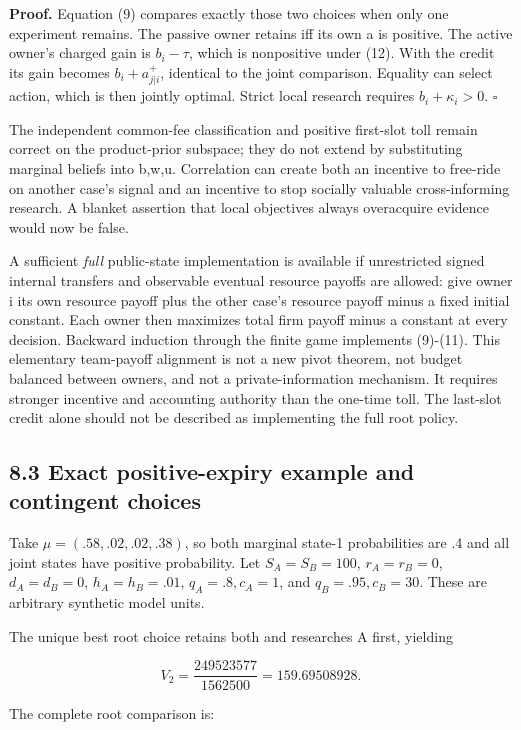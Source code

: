 \documentclass[
  11pt,
]{article}
\begin{document}
\textbf{Proof.} Equation (9) compares exactly those two choices when
only one experiment remains. The passive owner retains iff its own a is
positive. The active owner's charged gain is \(b_i-\tau\), which is
nonpositive under (12). With the credit its gain becomes
\(b_i+a_{j|i}^+\), identical to the joint comparison. Equality can
select action, which is then jointly optimal. Strict local research
requires \(b_i+\kappa_i>0\). \(\square\)

The independent common-fee classification and positive first-slot toll
remain correct on the product-prior subspace; they do not extend by
substituting marginal beliefs into b,w,u. Correlation can create both an
incentive to free-ride on another case's signal and an incentive to stop
socially valuable cross-informing research. A blanket assertion that
local objectives always overacquire evidence would now be false.

A sufficient \emph{full} public-state implementation is available if
unrestricted signed internal transfers and observable eventual resource
payoffs are allowed: give owner i its own resource payoff plus the other
case's resource payoff minus a fixed initial constant. Each owner then
maximizes total firm payoff minus a constant at every decision. Backward
induction through the finite game implements (9)-(11). This elementary
team-payoff alignment is not a new pivot theorem, not budget balanced
between owners, and not a private-information mechanism. It requires
stronger incentive and accounting authority than the one-time toll. The
last-slot credit alone should not be described as implementing the full
root policy.

\subsection{8.3 Exact positive-expiry example and contingent
choices}\label{exact-positive-expiry-example-and-contingent-choices}

Take \(\mu=(.58,.02,.02,.38)\), so both marginal state-1 probabilities
are .4 and all joint states have positive probability. Let
\(S_A=S_B=100\), \(r_A=r_B=0\), \(d_A=d_B=0\), \(h_A=h_B=.01\),
\(q_A=.8,c_A=1\), and \(q_B=.95,c_B=30\). These are arbitrary synthetic
model units.

The unique best root choice retains both and researches A first,
yielding

\[V_2=\frac{249523577}{1562500}=159.69508928.\]

The complete root comparison is:
\end{document}
